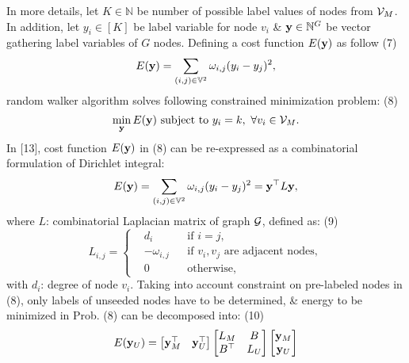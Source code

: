 \documentclass{article}
\begin{document}
\begin{itemize}
\begin{itemize}
        In more details, let $K\in\mathbb{N}$ be number of possible label values of nodes from ${\cal V}_M$. In addition, let $y_i\in[K]$ be label variable for node $v_i$ \& ${\bf y}\in\mathbb{N}^G$ be vector gathering label variables of $G$ nodes. Defining a cost function $E({\bf y})$ as follow (7)
        \begin{equation*}
            E({\bf y}) = \sum_{(i,j)\in\mathbb{V}^2} \omega_{i,j}(y_i - y_j)^2,
        \end{equation*}
        random walker algorithm solves following constrained minimization problem: (8)
        \begin{equation*}
            \min_{\bf y} E({\bf y})\mbox{ subject to } y_i = k,\ \forall v_i\in{\cal V}_M.
        \end{equation*}
        In [13], cost function $E({\bf y})$ in (8) can be re-expressed as a combinatorial formulation of Dirichlet integral:
        \begin{equation*}
            E({\bf y}) = \sum_{(i,j)\in\mathbb{V}^2} \omega_{i,j}(y_i - y_j)^2 = {\bf y}^\top L{\bf y},
        \end{equation*}
        where $L$: combinatorial Laplacian matrix of graph ${\cal G}$, defined as: (9)
        \begin{equation*}
            L_{i,j} = \left\{\begin{split}
                &d_i&&\mbox{if } i = j,\\
                &-\omega_{i,j}&&\mbox{if } v_i,v_j\mbox{ are adjacent nodes},\\
                &0&&\mbox{otherwise},
            \end{split}\right.
        \end{equation*}
        with $d_i$: degree of node $v_i$. Taking into account constraint on pre-labeled nodes in (8), only labels of unseeded nodes have to be determined, \& energy to be minimized in Prob. (8) can be decomposed into: (10)
        \begin{equation*}
            E({\bf y}_U) = \begin{bmatrix}
                {\bf y}_M^\top & {\bf y}_U^\top
            \end{bmatrix}\begin{bmatrix}
                L_M & B\\ B^\top & L_U
            \end{bmatrix}\begin{bmatrix}
                {\bf y}_M\\{\bf y}_U

\end{bmatrix}
\end{equation*}
\end{itemize}
\end{itemize}
\end{document}
